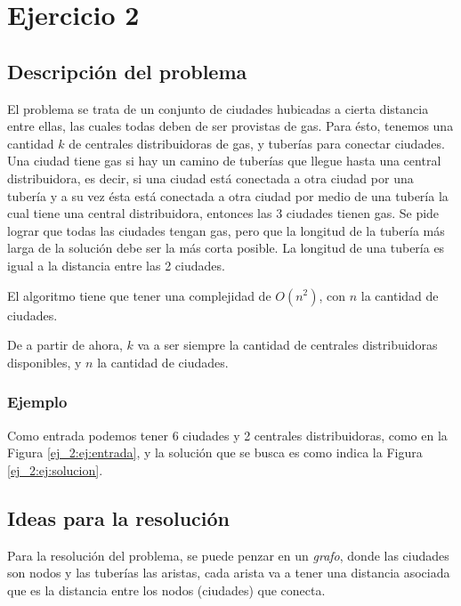 \section{Ejercicio 2}

\subsection{Descripci\'on del problema} \label{ej_2:descripcion}

El problema se trata de un conjunto de ciudades hubicadas a cierta distancia entre ellas, las cuales todas deben de ser provistas de gas.
Para \'esto, tenemos una cantidad $k$ de centrales distribuidoras de gas, y tuber\'ias para conectar ciudades.
Una ciudad tiene gas si hay un camino de tuber\'ias que llegue hasta una central distribuidora, es decir,
si una ciudad est\'a conectada a otra ciudad por una tuber\'ia y a su vez \'esta est\'a conectada a otra ciudad
por medio de una tuber\'ia la cual tiene una central distribuidora, entonces las 3 ciudades tienen gas.
Se pide lograr que todas las ciudades tengan gas, pero que la longitud de la tuber\'ia m\'as larga de la soluci\'on
debe ser la m\'as corta posible. La longitud de una tuber\'ia es igual a la distancia entre las 2 ciudades.

El algoritmo tiene que tener una complejidad de $O(n^2)$, con $n$ la cantidad de ciudades.

De a partir de ahora, $k$ va a ser siempre la cantidad de centrales distribuidoras disponibles, y $n$ la cantidad de ciudades.

\subsubsection{Ejemplo}

Como entrada podemos tener 6 ciudades y 2 centrales distribuidoras, como en la Figura \ref{ej_2:ej:entrada}, y la soluci\'on que se busca es como indica la Figura \ref{ej_2:ej:solucion}.



\subsection{Ideas para la resoluci\'on} \label{ej_2:idea}

Para la resoluci\'on del problema, se puede penzar en un \emph{grafo}, donde las ciudades son nodos y las tuber\'ias las aristas,
cada arista va a tener una distancia asociada que es la distancia entre los nodos (ciudades) que conecta.

